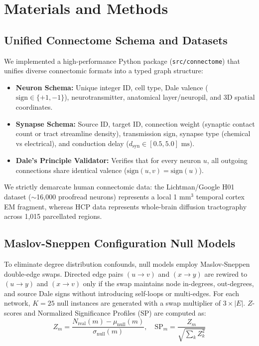 \documentclass[10pt,twocolumn,letterpaper]{article}
\begin{document}
\section{Materials and Methods}

\subsection{Unified Connectome Schema and Datasets}
We implemented a high-performance Python package (\texttt{src/connectome}) that unifies diverse connectomic formats into a typed graph structure:
\begin{itemize}[leftmargin=*]
    \item \textbf{Neuron Schema:} Unique integer ID, cell type, Dale valence ($\text{sign} \in \{+1, -1\}$), neurotransmitter, anatomical layer/neuropil, and 3D spatial coordinates.
    \item \textbf{Synapse Schema:} Source ID, target ID, connection weight (synaptic contact count or tract streamline density), transmission sign, synapse type (chemical vs electrical), and conduction delay ($d_{\mathrm{syn}} \in [0.5, 5.0]\text{ ms}$).
    \item \textbf{Dale's Principle Validator:} Verifies that for every neuron $u$, all outgoing connections share identical valence ($\text{sign}(u, v) = \text{sign}(u)$).
\end{itemize}
We strictly demarcate human connectomic data: the Lichtman/Google H01 dataset ($\sim$16,000 proofread neurons) represents a local 1 mm$^3$ temporal cortex EM fragment, whereas HCP data represents whole-brain diffusion tractography across 1,015 parcellated regions.

\subsection{Maslov-Sneppen Configuration Null Models}
To eliminate degree distribution confounds, null models employ Maslov-Sneppen double-edge swaps. Directed edge pairs $(u \to v)$ and $(x \to y)$ are rewired to $(u \to y)$ and $(x \to v)$ only if the swap maintains node in-degrees, out-degrees, and source Dale signs without introducing self-loops or multi-edges. For each network, $K = 25$ null instances are generated with a swap multiplier of $3 \times |E|$. $Z$-scores and Normalized Significance Profiles (SP) are computed as:
\begin{equation}
Z_m = \frac{N_{\mathrm{real}}(m) - \mu_{\mathrm{null}}(m)}{\sigma_{\mathrm{null}}(m)}, \quad \mathrm{SP}_m = \frac{Z_m}{\sqrt{\sum_k Z_k^2}}
\end{equation}
\end{document}
